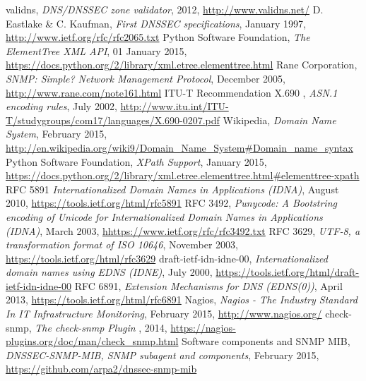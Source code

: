 \begin{thebibliography}{99}
 validns, {\em DNS/DNSSEC zone validator}, 2012, \url{http://www.validns.net/}
 D. Eastlake \& C. Kaufman, {\em First DNSSEC specifications}, January 1997, \url{http://www.ietf.org/rfc/rfc2065.txt}
 Python Software Foundation, {\em The ElementTree XML API}, 01 January 2015, \url{https://docs.python.org/2/library/xml.etree.elementtree.html}
 Rane Corporation, {\em SNMP: Simple? Network Management Protocol}, December  2005, \url{http://www.rane.com/note161.html}
 ITU-T Recommendation X.690 , {\em ASN.1 encoding rules}, July 2002, \url{http://www.itu.int/ITU-T/studygroups/com17/languages/X.690-0207.pdf}
 Wikipedia, {\em Domain Name System}, February  2015, \url{http://en.wikipedia.org/wiki9/Domain_Name_System#Domain_name_syntax}
 Python Software Foundation, {\em XPath Support}, January  2015, \url{https://docs.python.org/2/library/xml.etree.elementtree.html#elementtree-xpath}
 RFC 5891 {\em Internationalized Domain Names in Applications (IDNA)}, August 2010, \url{https://tools.ietf.org/html/rfc5891}
 RFC 3492, {\em Punycode: A Bootstring encoding of Unicode for Internationalized Domain Names in Applications (IDNA)}, March 2003, \url{hhttps://www.ietf.org/rfc/rfc3492.txt}
 RFC 3629, {\em UTF-8, a transformation format of ISO 10646}, November 2003, \url{https://tools.ietf.org/html/rfc3629}
 draft-ietf-idn-idne-00, {\em Internationalized domain names using EDNS (IDNE)}, July 2000, \url{https://tools.ietf.org/html/draft-ietf-idn-idne-00}
 RFC 6891, {\em Extension Mechanisms for DNS (EDNS(0))}, April 2013, \url{https://tools.ietf.org/html/rfc6891}
 Nagios, {\em Nagios - The Industry Standard In IT Infrastructure Monitoring}, February 2015, \url{http://www.nagios.org/}
 check-snmp, {\em The check-snmp Plugin }, 2014, \url{https://nagios-plugins.org/doc/man/check_snmp.html}
 Software components and SNMP MIB, {\em DNSSEC-SNMP-MIB, SNMP subagent and components}, February 2015, \url{https://github.com/arpa2/dnssec-snmp-mib}
\end{thebibliography}

